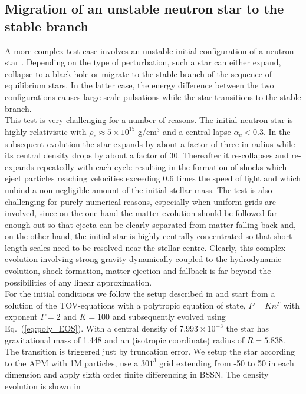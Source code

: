 \documentclass[useAMS,usenatbib]{iopart}
\begin{document}
\subsection{Migration of an unstable neutron star to the stable branch}
\label{sec:migration}
A more complex test case involves an unstable initial configuration
of a neutron star
 \cite{font02,cordero09,bernuzzi10}. Depending on the 
type of perturbation, such a star can either expand, collapse to a black hole or migrate
to the stable branch of the sequence of equilibrium stars. In the latter case,
the energy difference between the two configurations causes large-scale pulsations
while the star transitions to the stable branch. \\
This test is very challenging for a number of reasons. The initial neutron star  is highly relativistic 
with $\rho_c\approx 5 \times 10^{15}$ g/cm$^3$ and a central lapse
$\alpha_c < 0.3$. In the subsequent evolution the star expands by
about a factor of three in radius while its central density drops by about a factor of 30.
Thereafter it re-collapses and re-expands repeatedly with each cycle resulting
in the formation of shocks which  eject particles reaching velocities exceeding 0.6 times 
the speed of light and which unbind a non-negligible amount of the initial stellar mass. The test
is also challenging for purely numerical reasons, especially when uniform grids are
involved, since on the one hand the matter evolution should be followed far enough out
so that ejecta can be clearly separated from matter falling back and, on the other hand,
the initial star is highly centrally concentrated so that short length scales need to be 
resolved near the stellar centre.
Clearly, this complex evolution involving  strong gravity dynamically coupled 
to the hydrodynamic evolution, shock formation, matter ejection and fallback 
is far  beyond the possibilities of any linear approximation.\\
For the initial conditions we follow the setup described in \cite{bernuzzi10} and start from a solution
of the TOV-equations with a polytropic equation of state,  $P=  K n^\Gamma$ with 
exponent $\Gamma=2$ and $K=100$ and subsequently evolved using 
Eq.~(\ref{eq:poly_EOS}). With a central density of $7.993 \times 10^{-3}$ the
star has gravitational mass of 1.448 and an (isotropic coordinate) radius of $R= 5.838$.
The transition is triggered just by truncation error. We setup the star according to the 
APM with 1M particles, use a $301^3$ grid extending from -50 to 50 in each 
dimension and apply sixth order finite differencing in BSSN. The density evolution is shown in 
\end{document}
